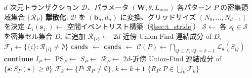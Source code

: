 \begin{algorithm}[t]
\caption{$d$ 次元 Apriori-Window アルゴリズム}
\label{alg:md_apriori}
\begin{algorithmic}[1]
\Require $d$ 次元トランザクション $\mathcal{D}$、パラメータ $(\bm{W}, \theta, L_{\max})$
\Ensure 各パターン $P$ の密集領域集合 $\{\mathcal{R}_P\}$
\State \textbf{離散化}: $\mathcal{D}$ を $(\bm{b}_n, d_n)$ に変換、グリッドサイズ $(N_0, \ldots, N_{d-1})$ を決定
  
  \State $L_i(\bm{s}_{1:}) \leftarrow $ 空間イベントリスト構築（\S\ref{sec:t_stride}）
  \ForAll{$\bm{s}_{1:} \in \prod_{k=1}^{d-1} [0, N_k)$}
      \State $\mathcal{S} \leftarrow $ 
      \State 各 $s_0 \in \mathcal{S}$ を密集セル集合 $D_i$ に追加
    \EndIf
  \EndFor
  \State $\mathcal{R}_{\{i\}} \leftarrow$ $2d$-近傍 Union-Find 連結成分 of $D_i$
\EndFor
\State $\mathcal{F}_1 \leftarrow \{\{i\} : \mathcal{R}_{\{i\}} \neq \emptyset\}$
  
  \State \texttt{cands} $\leftarrow$ 
  \State \texttt{cands} $\leftarrow$ 
    \State $\mathcal{C}(P) \leftarrow \bigcap_{Q \subset P,|Q|=k-1} \mathcal{L}_\theta(S_Q)$
     \textbf{continue} \EndIf
    \State $I_P \leftarrow$ 
    \State $\mathrm{PS}_P \leftarrow$ 
    \State $S_P \leftarrow$ 
    \State $\mathcal{R}_P \leftarrow$ $2d$-近傍 Union-Find 連結成分 of
           $\{\bm{s} : S_P(\bm{s}) \geq \theta\}$
  \EndFor
  \State $\mathcal{F}_k \leftarrow \{P : \mathcal{R}_P \neq \emptyset\}$,\quad
         $k \leftarrow k + 1$
\EndWhile
\Return $\{R_P : P \in \bigcup_k \mathcal{F}_k\}$
\end{algorithmic}
\end{algorithm}

